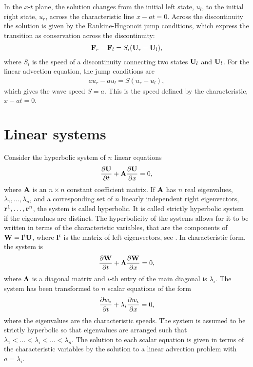 In the $x$-$t$ plane, the solution changes from the initial left state, $u_l$, to the initial right state, $u_r$, across the characteristic line $x - at = 0$.  Across the discontinuity the solution is given by the Rankine-Hugonoit jump conditions, which express the transition as conservation across the discontinuity:
\begin{gather}
\label{eqn:rh_jump}
\mathbf{F}_r - \mathbf{F}_l = S_i (\mathbf{U}_r - \mathbf{U}_l),
\end{gather}      
where $S_i$ is the speed of a discontinuity connecting two states $\mathbf{U}_l$ and $\mathbf{U}_l$.  For the linear advection equation, the jump conditions are
\begin{gather*}
a u_r - a u_l = S (u_r - u_l),
\end{gather*}      
which gives the wave speed $S = a$.  This is the speed defined by the characteristic, $x - at = 0$.

\section[Linear systems]{Linear systems}
\label{sec:lin_sys}

Consider the hyperbolic system of $n$ linear equations
\begin{gather}
\label{eqn:linear_sys}
\frac{\partial \mathbf{U}}{\partial t} + \mathbf{A}\frac{\partial \mathbf{U}}{\partial x} = 0,
\end{gather}
where $\mathbf{A}$ is an $n \times n$ constant coefficient matrix.  If $\mathbf{A}$ has $n$ real eigenvalues, $\lambda_1, \hdots, \lambda_n$, and a corresponding set of $n$ linearly independent right eigenvectors, $\mathbf{r}^1,\hdots,\mathbf{r}^n$, the system is called hyperbolic.  It is called strictly hyperbolic system if the eigenvalues are distinct.  The hyperbolicity of the systems allows for it to be written in terms of the characteristic variables, that are the components of $\mathbf{W} = \mathbf{l}^i \mathbf{U}$, where $\mathbf{l}^i$ is the matrix of left eigenvectors, see \citep{Toro:1999}.  In characteristic form, the system is 
\begin{gather}
\frac{\partial \mathbf{W}}{\partial t} + \mathbf{\Lambda} \frac{\partial \mathbf{W}}{\partial x} = 0,
\end{gather}  
where $\mathbf{\Lambda}$ is a diagonal matrix and  $i$-th entry of the main diagonal is $\lambda_i$.
The system has been transformed to $n$ scalar equations of the form
\begin{gather}
\frac{\partial w_i}{\partial t} + \lambda_i \frac{\partial w_i}{\partial x} = 0,
\end{gather}  
where the eigenvalues are the characteristic speeds.  The system is assumed to be strictly hyperbolic so that eigenvalues are arranged such that ${\lambda_1 < \hdots < \lambda_i < \hdots < \lambda_n}$.  The solution to each scalar equation is given in terms of the characteristic variables by the solution to a linear advection problem with $a = \lambda_i$. 

